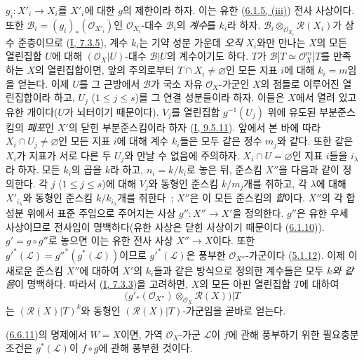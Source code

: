 $g_i:X'_i\to X_i$를 $X'_i$에 대한 $g$의 제한이라 하자. 이는 유한
(\hyperref[II.6.1.5-ko]{6.1.5, (iii)}) 전사 사상이다. 또한
$\mathcal{B}_i=(g_i)_*(\mathcal{O}_{X'_i})$인
$\mathcal{O}_{X_i}$-대수 $\mathcal{B}_i$의 \emph{계수}를 $k_i$라 하자.
$\mathcal{B}_i\otimes_{\mathcal{O}_{X_i}}\mathcal{R}(X_i)$가 상수
준층이므로 (\hyperref[I.7.3.5-ko]{I, 7.3.5}), 계수 $k_i$는 기약 성분
가운데 \emph{오직} $X_i$와만 만나는 $X$의 모든 열린집합 $U$에 대해
$(\mathcal{O}_X|U)$-대수 $\mathcal{B}|U$의 계수이기도 하다. $T$가
$\mathcal{B}|T\simeq\mathcal{O}_X^m|T$를 만족하는 $X$의 열린집합이면,
앞의 주의로부터 $T\cap X_i\neq\varnothing$인 모든 지표 $i$에 대해
$k_i=m$임을 얻는다. 이제 $U$를 그 근방에서 $\mathcal{B}$가 국소 자유
$\mathcal{O}_X$-가군인 $X$의 점들로 이루어진 열린집합이라 하고,
$U_j$ ($1\leq j\leq s$)를 그 연결 성분들이라 하자. 이들은 $X$에서
열려 있고 유한 개이다($U$가 뇌터이기 때문이다). $V_j$를 열린집합
$g^{-1}(U_j)$ 위에 유도된 부분준스킴의 \emph{폐포}인 $X'$의 닫힌
부분준스킴이라 하자 (\hyperref[I.9.5.11-ko]{I, 9.5.11}). 앞에서 본
바에 따라 $X_i\cap U_j\neq\varnothing$인 모든 지표 $i$에 대해 계수
$k_i$들은 모두 같은 정수 $m_j$와 같다. 또한 같은 $X_i$가 지표가 서로
다른 두 $U_j$와 만날 수 없음에 주의하자. $X_i\cap U=\varnothing$인
지표 $i$들을 $i_\lambda$라 하자. 모든 $k_i$의 곱을 $k$라 하고,
$n_i=k/k_i$로 놓은 뒤, 준스킴 $X''$을 다음과 같이 정의한다. 각
$j$ ($1\leq j\leq s$)에 대해 $V_j$와 동형인 준스킴 $k/m_j$개를
취하고, 각 $\lambda$에 대해 $X'_{i_\lambda}$와 동형인 준스킴
$k/k_{i_\lambda}$개를 취한다~; $X''$은 이 모든 준스킴의 \emph{합}이다.
$X''$의 각 합성분 위에서 표준 주입으로 주어지는 사상
$g'':X''\to X'$을 정의한다. $g''$은 유한 우세 사상이므로 전사임이
명백하다(유한 사상은 닫힌 사상이기 때문이다
(\hyperref[II.6.1.10-ko]{6.1.10})). $g'=g\circ g''$로 놓으면 이는
유한 전사 사상 $X''\to X$이다. 또한
${g'}^*(\mathcal{L})={g''}^*(g^*(\mathcal{L}))$이므로
${g'}^*(\mathcal{L})$은 풍부한 $\mathcal{O}_{X''}$-가군이다
(\hyperref[II.5.1.12-ko]{5.1.12}). 이제 이 새로운 준스킴 $X''$에
대하여 $X'$의 $k_i$들과 같은 방식으로 정의한 계수들은 모두
\emph{$k$와 같음}이 명백하다. 따라서
(\hyperref[I.7.3.3-ko]{I, 7.3.3})을 고려하면, $X$의 모든 아핀
열린집합 $T$에 대하여
\[
\bigl(g'_*(\mathcal{O}_{X''})
\otimes_{\mathcal{O}_X}\mathcal{R}(X)\bigr)|T
\]
는 $(\mathcal{R}(X)|T)^k$와 동형인
$(\mathcal{R}(X)|T)$-가군임을 곧바로 얻는다.

\begin{corollary}[6.6.12]
\label{II.6.6.12-ko}
(\hyperref[II.6.6.11-ko]{6.6.11})의 명제에서 $W=X$이면, 가역
$\mathcal{O}_X$-가군 $\mathcal{L}$이 $f$에 관해 풍부하기 위한
필요충분조건은 $g^*(\mathcal{L})$이 $f\circ g$에 관해 풍부한 것이다.
\end{corollary}

